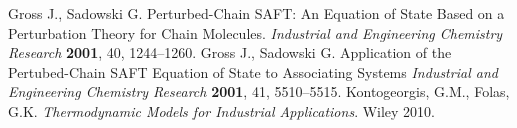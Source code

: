 \documentclass[english]{../thermomemo/thermomemo}
\begin{document}
\begin{thebibliography}{11}
 Gross J., Sadowski G. Perturbed-Chain SAFT: An Equation of State Based on a Perturbation Theory for Chain Molecules. \textit{Industrial and Engineering Chemistry Research} \textbf{2001}, 40, 1244--1260.
 Gross J., Sadowski G. Application of the Pertubed-Chain SAFT Equation of State to Associating Systems \textit{Industrial and Engineering Chemistry Research} \textbf{2001}, 41, 5510--5515.
 Kontogeorgis, G.M., Folas, G.K. \textit{Thermodynamic Models for Industrial Applications}. Wiley 2010.
\end{thebibliography}
\end{document}
